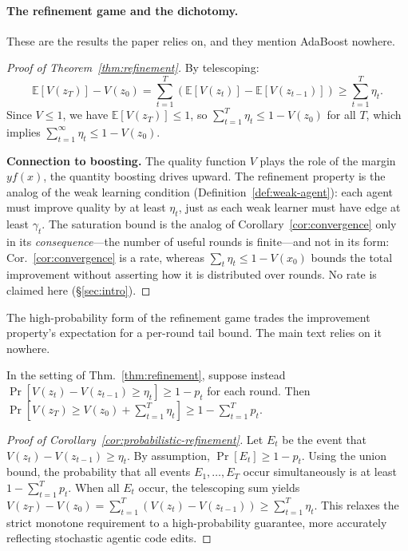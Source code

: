 \paragraph{The refinement game and the dichotomy.} These are the results the paper relies on, and they mention AdaBoost nowhere.

\begin{proof}[Proof of Theorem~\ref{thm:refinement}]
By telescoping:
\[
\mathbb{E}[V(z_T)] - V(z_0) = \sum_{t=1}^T \left(\mathbb{E}[V(z_t)] - \mathbb{E}[V(z_{t-1})]\right) \geq \sum_{t=1}^T \eta_t.
\]
Since $V \leq 1$, we have $\mathbb{E}[V(z_T)] \leq 1$, so $\sum_{t=1}^T \eta_t \leq 1 - V(z_0)$ for all $T$, which implies $\sum_{t=1}^\infty \eta_t \leq 1 - V(z_0)$.

\textbf{Connection to boosting.} The quality function $V$ plays the role of the margin $y f(x)$, the quantity boosting drives upward. The refinement property is the analog of the weak learning condition (Definition~\ref{def:weak-agent}): each agent must improve quality by at least $\eta_t$, just as each weak learner must have edge at least $\gamma_t$. The saturation bound is the analog of Corollary~\ref{cor:convergence} only in its \emph{consequence}---the number of useful rounds is finite---and not in its form: Cor.~\ref{cor:convergence} is a rate, whereas $\sum_t\eta_t\le1-V(x_0)$ bounds the total improvement without asserting how it is distributed over rounds. No rate is claimed here (\S\ref{sec:intro}).
\end{proof}

The high-probability form of the refinement game trades the improvement property's expectation for a per-round tail bound. The main text relies on it nowhere.

\begin{corollary}
\label{cor:probabilistic-refinement}
In the setting of Thm.~\ref{thm:refinement}, suppose instead $\Pr[V(z_t)-V(z_{t-1})\ge\eta_t]\ge1-p_t$ for each round. Then $\Pr\!\left[V(z_T)\ge V(z_0)+\sum_{t=1}^T\eta_t\right]\ge1-\sum_{t=1}^T p_t$.
\end{corollary}

\begin{proof}[Proof of Corollary~\ref{cor:probabilistic-refinement}]
Let $E_t$ be the event that $V(z_t) - V(z_{t-1}) \geq \eta_t$. By assumption, $\Pr[E_t] \geq 1 - p_t$. Using the union bound, the probability that all events $E_1, \dots, E_T$ occur simultaneously is at least $1 - \sum_{t=1}^T p_t$. When all $E_t$ occur, the telescoping sum yields $V(z_T) - V(z_0) = \sum_{t=1}^T (V(z_t) - V(z_{t-1})) \geq \sum_{t=1}^T \eta_t$. This relaxes the strict monotone requirement to a high-probability guarantee, more accurately reflecting stochastic agentic code edits.
\end{proof}


